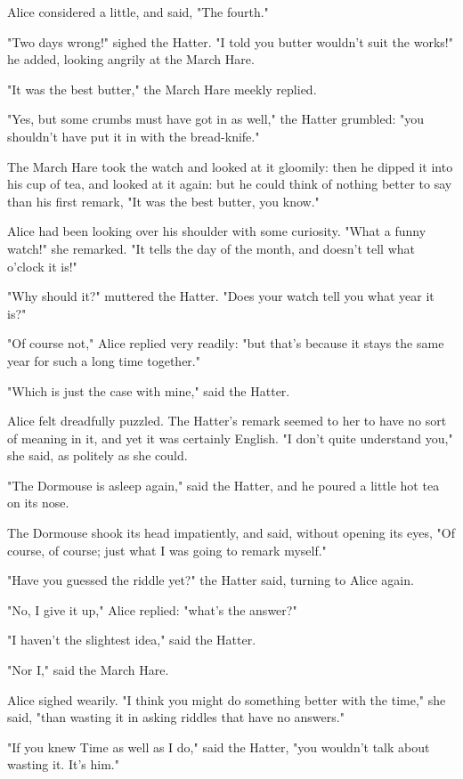 Alice considered a little, and said, "The fourth."

"Two days wrong!" sighed the Hatter. "I told you butter wouldn't suit the works!" he added, looking angrily at the March Hare.

"It was the best butter," the March Hare meekly replied.

"Yes, but some crumbs must have got in as well," the Hatter grumbled: "you shouldn't have put it in with the bread-knife."

The March Hare took the watch and looked at it gloomily: then he dipped it into his cup of tea, and looked at it again: but he could think of nothing better to say than his first remark, "It was the best butter, you know."

Alice had been looking over his shoulder with some curiosity. "What a funny watch!" she ​remarked. "It tells the day of the month, and doesn't tell what o'clock it is!"

"Why should it?" muttered the Hatter. "Does your watch tell you what year it is?"

"Of course not," Alice replied very readily: "but that's because it stays the same year for such a long time together."

"Which is just the case with mine," said the Hatter.

Alice felt dreadfully puzzled. The Hatter's remark seemed to her to have no sort of meaning in it, and yet it was certainly English. "I don't quite understand you," she said, as politely as she could.

"The Dormouse is asleep again," said the Hatter, and he poured a little hot tea on its nose.

The Dormouse shook its head impatiently, and said, without opening its eyes, "Of course, of course; just what I was going to remark myself."

"Have you guessed the riddle yet?" the Hatter said, turning to Alice again.

​"No, I give it up," Alice replied: "what's the answer?"

"I haven't the slightest idea," said the Hatter.

"Nor I," said the March Hare.

Alice sighed wearily. "I think you might do something better with the time," she said, "than wasting it in asking riddles that have no answers."

"If you knew Time as well as I do," said the Hatter, "you wouldn't talk about wasting it. It's him."

